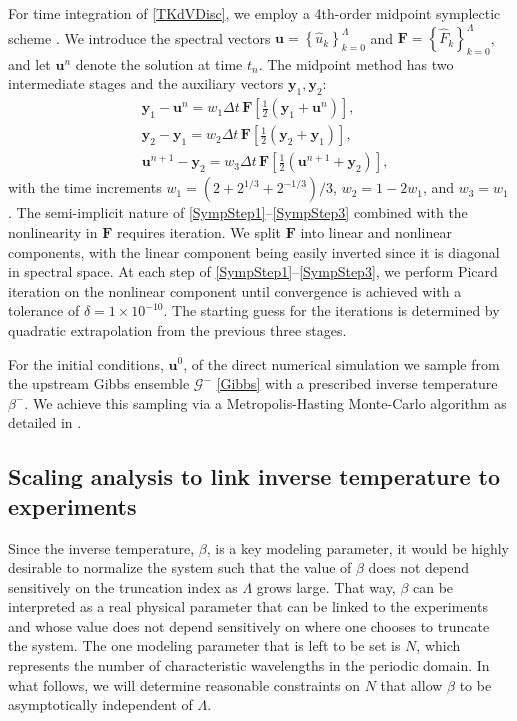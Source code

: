 \documentclass[11pt]{article}
\newcommand{\lamfac}{N}
\newcommand{\uhat}{\hat{u}}
\newcommand{\Gibbs}{\mathcal{G}}
\newcommand{\Gup}{\Gibbs^{-}}
\newcommand{\invtemp}{\beta}
\newcommand{\itup}{\invtemp^{-}}
\newcommand{\RHS}{F}
\newcommand{\RHSh}{\hat{\RHS}}
\newcommand{\uhvec}{\mathbf{u}}
\newcommand{\RHSvec}{\mathbf{F}}
\begin{document}
For time integration of \eqref{TKdVDisc}, we employ a 4th-order midpoint symplectic scheme \cite{mclachlan1993symplectic}. We introduce the spectral vectors $\uhvec = \left\{ \uhat_{k}\right\}_{k=0}^{\Lambda}$ and $\RHSvec = \left\{ \RHSh_{k} \right\}_{k=0}^{\Lambda}$, and let $\uhvec^n$ denote the solution at time $t_n$. The midpoint method has two intermediate stages and the auxiliary vectors $\mathbf{y}_{1},\mathbf{y}_{2}$:
\begin{align}
\label{SympStep1}
&\mathbf{y}_{1} - \uhvec^n = w_{1}\Delta t \, \RHSvec
\left[ \frac{1}{2}  \left(\mathbf{y}_{1} + \uhvec^n \right) \right] ,\\
&\mathbf{y}_{2}-\mathbf{y}_{1} = w_{2}\Delta t \, \RHSvec
\left[ \frac{1}{2} \left(\mathbf{y}_{2} + \mathbf{y}_{1}\right) \right] ,\\
\label{SympStep3}
&\uhvec^{n+1}-\mathbf{y}_{2} = w_{3}\Delta t \, \RHSvec
\left[ \frac{1}{2} \left( \uhvec^{n+1} + \mathbf{y}_{2}\right) \right] ,
\end{align}
with the time increments $w_{1}=\left(2+2^{1/3}+2^{-1/3}\right)/3$, $w_{2}=1-2w_{1}$, and $w_{3}=w_{1}$. The semi-implicit nature of \eqref{SympStep1}--\eqref{SympStep3} combined with the nonlinearity in $\RHSvec$ requires iteration. We split $\RHSvec$ into linear and nonlinear components, with the linear component being easily inverted since it is diagonal in spectral space. At each step of \eqref{SympStep1}--\eqref{SympStep3}, we perform Picard iteration on the nonlinear component until convergence is achieved with a tolerance of $\delta = 1\times10^{-10}$. The starting guess for the iterations is determined by quadratic extrapolation from the previous three stages.

	For the initial conditions, $\uhvec^0$, of the direct numerical simulation we sample from the upstream Gibbs ensemble $\Gup$ \eqref{Gibbs} with a prescribed inverse temperature $\itup$. We achieve this sampling via a Metropolis-Hasting Monte-Carlo algorithm as detailed in \cite{majda2019}. 


\subsection{Scaling analysis to link inverse temperature to experiments}

	Since the inverse temperature, $\invtemp$, is a key modeling parameter, it would be highly desirable to normalize the system such that the value of $\invtemp$ does not depend sensitively on the truncation index as $\Lambda$ grows large. That way, $\invtemp$ can be interpreted as a real physical parameter that can be linked to the experiments and whose value does not depend sensitively on where one chooses to truncate the system. The one modeling parameter that is left to be set is $\lamfac$, which represents the number of characteristic wavelengths in the periodic domain. In what follows, we will determine reasonable constraints on $\lamfac$ that allow $\invtemp$ to be asymptotically independent of $\Lambda$.
	
\end{document}
